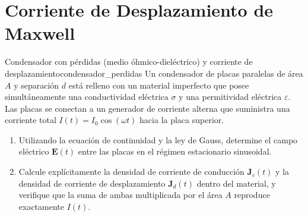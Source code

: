 \documentclass[11pt,a4paper]{book}
\newcommand{\Evec}{\bm{E}}
\newcommand{\Jvec}{\bm{J}}
\begin{document}
\section{Corriente de Desplazamiento de Maxwell}

\begin{ejercicio}{Condensador con pérdidas (medio óhmico-dieléctrico) y corriente de desplazamiento}{condensador_perdidas}
Un condensador de placas paralelas de área $A$ y separación $d$ está relleno con un material imperfecto que posee simultáneamente una conductividad eléctrica $\sigma$ y una permitividad eléctrica $\varepsilon$. Las placas se conectan a un generador de corriente alterna que suministra una corriente total $I(t) = I_0 \cos(\omega t)$ hacia la placa superior.
\begin{enumerate}[label=\alph*)]
    \item Utilizando la ecuación de continuidad y la ley de Gauss, determine el campo eléctrico $\Evec(t)$ entre las placas en el régimen estacionario sinusoidal.
    \item Calcule explícitamente la densidad de corriente de conducción $\Jvec_c(t)$ y la densidad de corriente de desplazamiento $\Jvec_d(t)$ dentro del material, y verifique que la suma de ambas multiplicada por el área $A$ reproduce exactamente $I(t)$.
\end{enumerate}
\end{ejercicio}
\end{document}
